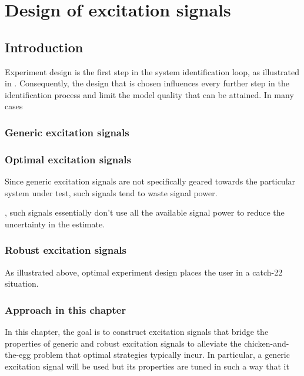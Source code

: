\chapter{Design of excitation signals}
\def\thisDir{ch02-qlogms}

\section{Introduction}
\label{sec:excitation:intro}
Experiment design is the first step in the system identification loop, as illustrated in .
Consequently, the design that is chosen influences every further step in the identification process and limit the model quality that can be attained.
In many cases

\subsection{Generic excitation signals}
\label{sec:excitation:intro:generic}


\subsection{Optimal excitation signals}
\label{sec:excitation:intro:optimal}
Since generic excitation signals are not specifically geared towards the particular system under test, such signals tend to waste signal power.

, such signals essentially don't use all the available signal power to reduce the uncertainty in the estimate.


\subsection{Robust excitation signals}
\label{sec:excitation:intro:robust}
As illustrated above, optimal experiment design places the user in a catch-22 situation.

\subsection{Approach in this chapter}
\label{sec:excitation:intro:approach}
In this chapter, the goal is to construct excitation signals that bridge the properties of generic and robust excitation signals to alleviate the chicken-and-the-egg problem that optimal strategies typically incur.
In particular, a generic excitation signal will be used but its properties are tuned in such a way that it 

